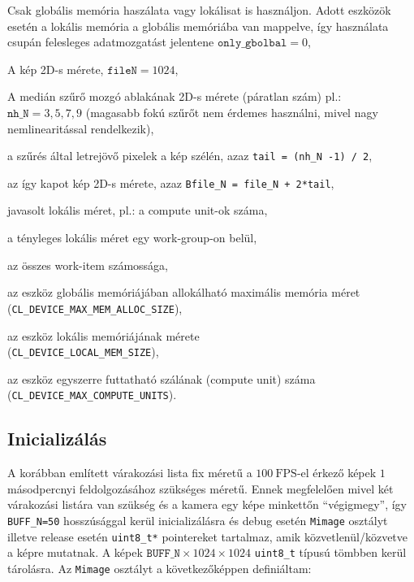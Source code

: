 	\begin{description}[noitemsep]
	\item[only\_global] Csak globális memória haszálata vagy lokálisat is használjon. Adott eszközök esetén a lokális memória a
	globális memóriába van mappelve, így használata csupán felesleges adatmozgatást jelentene $\texttt{only\_gbolbal} = 0$,
	\item[file\_N] A kép 2D-s mérete, $\texttt{fileN} = 1024$,
	\item[nh\_N] A medián szűrő mozgó ablakának 2D-s mérete (páratlan szám) pl.: $\texttt{nh\_N} = 3,5,7,9$ (magasabb fokú szűrőt
	nem érdemes használni, mivel nagy nemlinearitással rendelkezik),
	\item[tail] a szűrés által letrejövő pixelek a kép szélén, azaz \texttt{tail = (nh\_N -1) / 2},
	\item[Bfile\_N] az így kapot kép 2D-s mérete, azaz \texttt{Bfile\_N = file\_N + 2*tail},
	\item[pplN] javasolt lokális méret, pl.: a compute unit-ok száma,
	\item[localN] a tényleges lokális méret egy work-group-on belül,
	\item[globalN] az összes work-item számossága,
	\item[aSize] az eszköz globális memóriájában allokálható maximális memória méret\\
		(\texttt{CL\_DEVICE\_MAX\_MEM\_ALLOC\_SIZE}),
	\item[lSize] az eszköz lokális memóriájának mérete\\
		(\texttt{CL\_DEVICE\_LOCAL\_MEM\_SIZE}),
	\item[mCuint] az eszköz egyszerre futtatható szálának (compute unit) száma \\
		(\texttt{CL\_DEVICE\_MAX\_COMPUTE\_UNITS}).
	\end{description}
	

	\subsection*{Inicializálás}
	A korábban említett várakozási lista fix méretű a $100\ \mathrm{FPS}$-el érkező képek $1$ másodpercnyi feldolgozásához szükséges
	méretű. Ennek megfelelően mivel két várakozási listára van szükség és a kamera egy képe minkettőn ``végigmegy'', így
	\texttt{BUFF\_N=50} hosszúsággal kerül inicializálásra és debug esetén \texttt{Mimage} osztályt illetve release esetén
	\texttt{uint8\_t*} pointereket tartalmaz, amik közvetlenül/közvetve a képre mutatnak.
	A képek $\texttt{BUFF\_N} \times 1024 \times 1024$ \texttt{uint8\_t} típusú tömbben kerül tárolásra.
	Az \texttt{Mimage} osztályt a következőképpen definiáltam:
	
